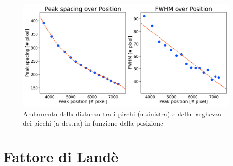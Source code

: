 \documentclass[twocolumn,10pt]{asme2ej}
\begin{document}
\begin{figure}
    \centering
    \includegraphics[width=\linewidth]{../Plots/Boff_spacing_trend.png}
    \caption{Andamento della distanza tra i picchi (a sinistra) e della larghezza dei picchi (a destra) in funzione della posizione}
    \label{i:spacing_trend_Boff}
    \vspace{-10pt}
\end{figure}




\section{Fattore di Landè}\label{s:lande}

\end{document}

